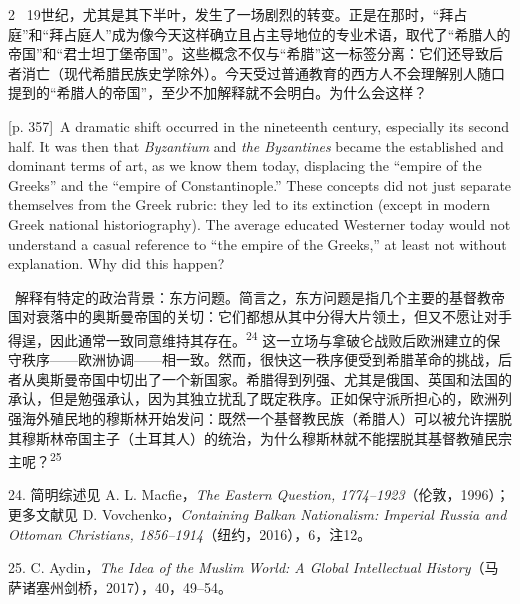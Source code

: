 \documentclass[10pt,a4paper]{article}
\begin{document}
\begin{paracol}{2}
\switchcolumn*
{\scriptsize\color{gray}[p. 357]}\ 19世纪，尤其是其下半叶，发生了一场剧烈的转变。正是在那时，“拜占庭”和“拜占庭人”成为像今天这样确立且占主导地位的专业术语，取代了“希腊人的帝国”和“君士坦丁堡帝国”。这些概念不仅与“希腊”这一标签分离：它们还导致后者消亡（现代希腊民族史学除外）。今天受过普通教育的西方人不会理解别人随口提到的“希腊人的帝国”，至少不加解释就不会明白。为什么会这样？\par
\switchcolumn
{\scriptsize\color{gray}[p. 357]}\ A dramatic shift occurred in the nineteenth century, especially its second half. It was then that \textit{Byzantium} and \textit{the Byzantines} became the established and dominant terms of art, as we know them today, displacing the “empire of the Greeks” and the “empire of Constantinople.” These concepts did not just separate themselves from the Greek rubric: they led to its extinction (except in modern Greek national historiography). The average educated Westerner today would not understand a casual reference to “the empire of the Greeks,” at least not without explanation. Why did this happen?\par
\switchcolumn*
{\scriptsize\color{gray}[p. 357–358]}\ 解释有特定的政治背景：东方问题。简言之，东方问题是指几个主要的基督教帝国对衰落中的奥斯曼帝国的关切：它们都想从其中分得大片领土，但又不愿让对手得逞，因此通常一致同意维持其存在。\nobreak\textsuperscript{24} 这一立场与拿破仑战败后欧洲建立的保守秩序——欧洲协调——相一致。然而，很快这一秩序便受到希腊革命的挑战，后者从奥斯曼帝国中切出了一个新国家。希腊得到列强、尤其是俄国、英国和法国的承认，但是勉强承认，因为其独立扰乱了既定秩序。正如保守派所担心的，欧洲列强海外殖民地的穆斯林开始发问：既然一个基督教民族（希腊人）可以被允许摆脱其穆斯林帝国主子（土耳其人）的统治，为什么穆斯林就不能摆脱其基督教殖民宗主呢？\nobreak\textsuperscript{25}\par{\small 24. 简明综述见 A. L. Macfie，\textit{The Eastern Question, 1774–1923}（伦敦，1996）；更多文献见 D. Vovchenko，\textit{Containing Balkan Nationalism: Imperial Russia and Ottoman Christians, 1856–1914}（纽约，2016），6，注12。\par}{\small 25. C. Aydin，\textit{The Idea of the Muslim World: A Global Intellectual History}（马萨诸塞州剑桥，2017），40，49–54。\par}
\switchcolumn

\end{paracol}
\end{document}
